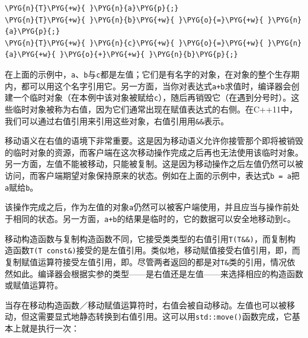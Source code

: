
\begin{codeblockbg}
\begin{Verbatim}[commandchars=\\\{\},breaklines=true,breakanywhere=true,fontsize=\codefont,xleftmargin=17bp]
\PYG{n}{T}\PYG{+w}{ }\PYG{n}{a}\PYG{p}{;}
\PYG{n}{T}\PYG{+w}{ }\PYG{n}{b}\PYG{+w}{ }\PYG{o}{=}\PYG{+w}{ }\PYG{n}{a}\PYG{p}{;}
\PYG{n}{T}\PYG{+w}{ }\PYG{n}{c}\PYG{+w}{ }\PYG{o}{=}\PYG{+w}{ }\PYG{n}{a}\PYG{+w}{ }\PYG{o}{+}\PYG{+w}{ }\PYG{n}{b}\PYG{p}{;}
\end{Verbatim}
\end{codeblockbg}



在上面的示例中，\texttt{a}、\texttt{b}与\texttt{c}都是左值；它们是有名字的对象，在对象的整个生存期内，都可以用这个名字引用它。另一方面，当你对表达式\texttt{a+b}求值时，编译器会创建一个临时对象（在本例中该对象被赋给\texttt{c}），随后再销毁它（在遇到分号时）。这些临时对象被称为右值，因为它们通常出现在赋值表达式的右侧。在C++11中，我们可以通过右值引用来引用这些对象，右值引用用\texttt{\&\&}表示。



移动语义在右值的语境下非常重要。这是因为移动语义允许你接管那个即将被销毁的临时对象的资源，而客户端在这次移动操作完成之后再也无法使用该临时对象。另一方面，左值不能被移动，只能被复制。这是因为移动操作之后左值仍然可以被访问，而客户端期望对象保持原来的状态。例如在上面的示例中，表达式\texttt{b = a}把\texttt{a}赋给\texttt{b}。



该操作完成之后，作为左值的对象\texttt{a}仍然可以被客户端使用，并且应当与操作前处于相同的状态。另一方面，\texttt{a+b}的结果是临时的，它的数据可以安全地移动到\texttt{c}。



移动构造函数与复制构造函数不同，它接受类类型的右值引用\texttt{T(\allowbreak{}T\&\&)}，而复制构造函数\texttt{T(\allowbreak{}T const\&)}接受的是左值引用。类似地，移动赋值接受右值引用，即，而复制赋值运算符接受左值引用，即。尽管两者返回的都是对\texttt{T\&}类的引用，情况依然如此。编译器会根据实参的类型——是右值还是左值——来选择相应的构造函数或赋值运算符。



当存在移动构造函数／移动赋值运算符时，右值会被自动移动。左值也可以被移动，但这需要显式地静态转换到右值引用。这可以用\texttt{std::\allowbreak{}move()}函数完成，它基本上就是执行一次：


